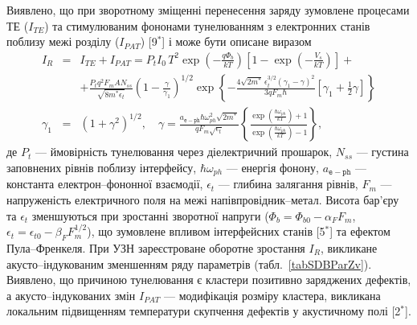 Виявлено, що при зворотному зміщенні
перенесення заряду зумовлене процесами ТЕ ($I_{TE}$) та стимулюваним фононами тунелюванням з електронних станів поблизу межі розділу ($I_{P\!AT}$)
[9$^*$]
і може бути описане виразом
\begin{eqnarray}
\label{eqIgen}
 I_R&=&I_{TE}+I_{P\!AT}=P_tI_0\,T^2\exp\left(-\frac{q\Phi_b}{kT}\right)\left[1-\exp\left(-\frac{V_s}{kT}\right)\right]+\\
 &&+\frac{P_tq^2F_mAN_{ss}}{\sqrt{8m^*\epsilon_t}}\left(1-\frac{\gamma}{\gamma_1}\right)^{1/2}\exp
    \left\{-\frac{4\sqrt{2m^*}\,\epsilon_t^{3/2}\left(\gamma_1-\gamma\right)^2}{3qF_m\hbar} \nonumber
    [\gamma_1+\frac{1}{2}\gamma]\right\}\\ \nonumber
    \gamma_1&=&(1+\gamma^2)^{1/2}, \quad
    \gamma=\frac{a_\mathtt{e-ph}\hbar\omega_{ph}^2\sqrt{2m^*}}{qF_m\sqrt{\epsilon_t}}
    \left\{\frac{\exp\left(\frac{\hbar\omega_{ph}}{kT}\right)+1}{\exp\left(\frac{\hbar\omega_{ph}}{kT}\right)-1}\right\},   \nonumber
\end{eqnarray}
де
$P_t$ --- ймовірність тунелювання через діелектричний прошарок,
$N_{ss}$ --- густина заповнених рівнів поблизу інтерфейсу,
$\hbar\omega_{ph}$ --- енергія фонону,
$a_\mathtt{e-ph}$ --- константа електрон--фононної взаємодії,
$\epsilon_t$ --- глибина залягання рівнів,
$F_m$ --- напруженість електричного поля на межі напівпровідник--метал.
Висота бар'єру та $\epsilon_t$ зменшуються при зростанні зворотної напруги
($\Phi_{b}=\Phi_{b0}-\alpha_{F} F_m$,
$\epsilon_t=\epsilon_{t0}-\beta_F F_m^{1/2}$), що зумовлене впливом інтерфейсних станів
[5$^*$] та ефектом Пула--Френкеля.
При УЗН зареєстроване оборотне зростання $I_R$, викликане акусто--індукованим зменшенням ряду параметрів (табл.~\ref{tabSDBParZv}).
Виявлено, що причиною тунелювання є кластери позитивно заряджених дефектів, а акусто--індукованих змін $I_{P\!AT}$ --- модифікація розміру кластера, викликана
локальним підвищенням температури скупчення дефектів у акустичному полі
[2$^*$].




